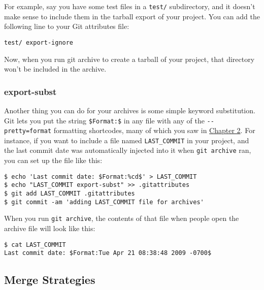\documentclass[a4paper]{book}
\newcommand{\prechap}{Chapter }
\newcommand{\postchap}{}
\newcommand{\chapref}[1]{\hyperref[chap:#1]{\prechap #1\postchap}}
\begin{document}
For example, say you have some test files in a \texttt{test/} subdirectory, and it doesn't make sense to include them in the tarball export of your project. You can add the following line to your Git attributes file:

\begin{shaded}\begin{verbatim}
test/ export-ignore
\end{verbatim}\end{shaded}

Now, when you run git archive to create a tarball of your project, that directory won't be included in the archive.

\subsubsection{export-subst}

Another thing you can do for your archives is some simple keyword substitution. Git lets you put the string \texttt{\$Format:\$} in any file with any of the \texttt{-{}-pretty=format} formatting shortcodes, many of which you saw in \chapref{2}. For instance, if you want to include a file named \texttt{LAST\_COMMIT} in your project, and the last commit date was automatically injected into it when \texttt{git archive} ran, you can set up the file like this:

\begin{shaded}\begin{verbatim}
$ echo 'Last commit date: $Format:%cd$' > LAST_COMMIT
$ echo "LAST_COMMIT export-subst" >> .gitattributes
$ git add LAST_COMMIT .gitattributes
$ git commit -am 'adding LAST_COMMIT file for archives'
\end{verbatim}\end{shaded}

When you run \texttt{git archive}, the contents of that file when people open the archive file will look like this:

\begin{shaded}\begin{verbatim}
$ cat LAST_COMMIT
Last commit date: $Format:Tue Apr 21 08:38:48 2009 -0700$
\end{verbatim}\end{shaded}

\subsection{Merge Strategies}\label{merge-strategies}
\end{document}
